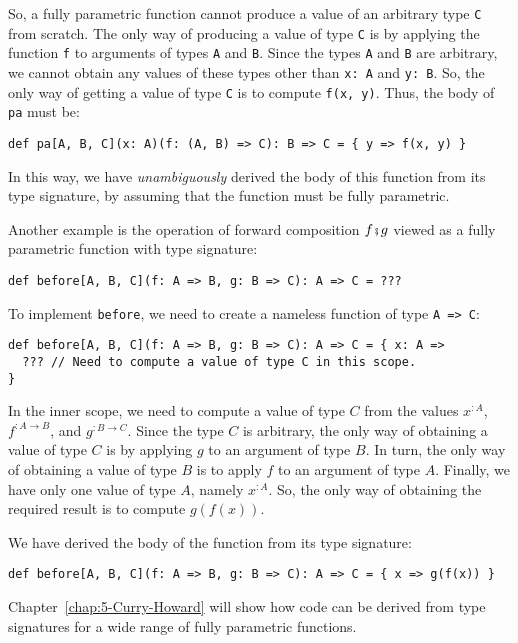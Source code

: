 So, a fully parametric function cannot produce a value of an arbitrary
type \lstinline!C! from scratch. The only way of producing a value
of type \lstinline!C! is by applying the function \lstinline!f!
to arguments of types \lstinline!A! and \lstinline!B!. Since the
types \lstinline!A! and \lstinline!B! are arbitrary, we cannot obtain
any values of these types other than \lstinline!x: A! and \lstinline!y: B!.
So, the only way of getting a value of type \lstinline!C! is to compute
\lstinline!f(x, y)!. Thus, the body of \lstinline!pa! must be:
\begin{lstlisting}
def pa[A, B, C](x: A)(f: (A, B) => C): B => C = { y => f(x, y) }
\end{lstlisting}
In this way, we have \emph{unambiguously} derived the body of this
function from its type signature, by assuming that the function must
be fully parametric.

Another example is the operation of forward composition $f\bef g$
viewed as a fully parametric function with type signature:
\begin{lstlisting}
def before[A, B, C](f: A => B, g: B => C): A => C = ???
\end{lstlisting}
To implement \lstinline!before!, we need to create a nameless function
of type \lstinline!A => C!:
\begin{lstlisting}
def before[A, B, C](f: A => B, g: B => C): A => C = { x: A =>
  ??? // Need to compute a value of type C in this scope.
}
\end{lstlisting}
In the inner scope, we need to compute a value of type $C$ from the
values $x^{:A}$, $f^{:A\rightarrow B}$, and $g^{:B\rightarrow C}$.
Since the type $C$ is arbitrary, the only way of obtaining a value
of type $C$ is by applying $g$ to an argument of type $B$. In turn,
the only way of obtaining a value of type $B$ is to apply $f$ to
an argument of type $A$. Finally, we have only one value of type
$A$, namely $x^{:A}$. So, the only way of obtaining the required
result is to compute $g(f(x))$.

We have derived the body of the function from its type signature:
\begin{lstlisting}
def before[A, B, C](f: A => B, g: B => C): A => C = { x => g(f(x)) }
\end{lstlisting}

Chapter~\ref{chap:5-Curry-Howard} will show how code can be derived
from type signatures for a wide range of fully parametric functions.
